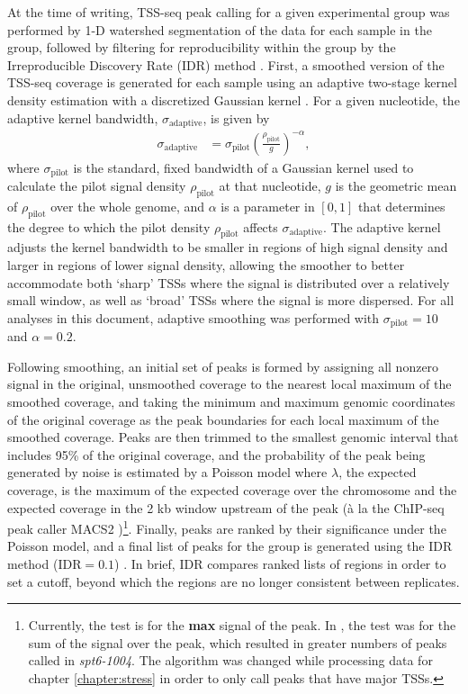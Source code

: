 At the time of writing, TSS-seq peak calling for a given experimental group was performed by 1-D watershed segmentation of the data for each sample in the group, followed by filtering for reproducibility within the group by the Irreproducible Discovery Rate (IDR) method \citep{li2011}.
First, a smoothed version of the TSS-seq coverage is generated for each sample using an adaptive two-stage kernel density estimation with a discretized Gaussian kernel \citep{silverman1986}.
For a given nucleotide, the adaptive kernel bandwidth, $\sigma_{\text{adaptive}}$, is given by
\begin{align*}
    \sigma_{\text{adaptive}} &= \sigma_\text{pilot} \left( \frac{\rho_{\text{pilot}}}{g} \right)^{-\alpha},
\end{align*}
where $\sigma_\text{pilot}$ is the standard, fixed bandwidth of a Gaussian kernel used to calculate the pilot signal density $\rho_\text{pilot}$ at that nucleotide, $g$ is the geometric mean of $\rho_\text{pilot}$ over the whole genome, and $\alpha$ is a parameter in $[0,1]$ that determines the degree to which the pilot density $\rho_\text{pilot}$ affects $\sigma_\text{adaptive}$.
The adaptive kernel adjusts the kernel bandwidth to be smaller in regions of high signal density and larger in regions of lower signal density, allowing the smoother to better accommodate both `sharp' TSSs where the signal is distributed over a relatively small window, as well as `broad' TSSs where the signal is more dispersed.
For all analyses in this document, adaptive smoothing was performed with $\sigma_\text{pilot} = 10$ and $\alpha = 0.2$.

Following smoothing, an initial set of peaks is formed by assigning all nonzero signal in the original, unsmoothed coverage to the nearest local maximum of the smoothed coverage, and taking the minimum and maximum genomic coordinates of the original coverage as the peak boundaries for each local maximum of the smoothed coverage.
Peaks are then trimmed to the smallest genomic interval that includes 95\% of the original coverage, and the probability of the peak being generated by noise is estimated by a Poisson model where $\lambda$, the expected coverage, is the maximum of the expected coverage over the chromosome and the expected coverage in the 2 kb window upstream of the peak (\`a la the ChIP-seq peak caller MACS2 \citep{zhang2008})\footnote{Currently, the test is for the \textbf{max} signal of the peak. In \citet{doris2018}, the test was for the sum of the signal over the peak, which resulted in greater numbers of peaks called in \textit{spt6-1004}. The algorithm was changed while processing data for chapter \ref{chapter:stress} in order to only call peaks that have major TSSs.}.
Finally, peaks are ranked by their significance under the Poisson model, and a final list of peaks for the group is generated using the IDR method ($\text{IDR}=0.1$) \citep{li2011}.
In brief, IDR compares ranked lists of regions in order to set a cutoff, beyond which the regions are no longer consistent between replicates.

